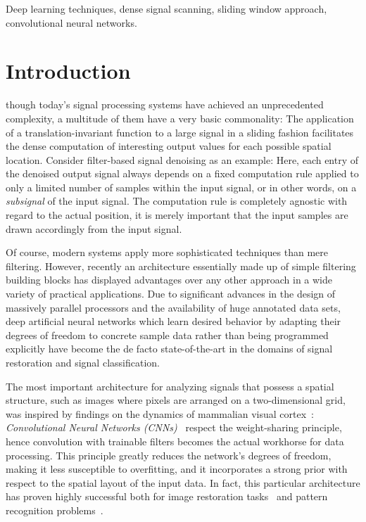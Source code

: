 \documentclass[journal]{IEEEtran}
\begin{document}
\begin{IEEEkeywords}
Deep learning techniques, dense signal scanning, sliding window approach, convolutional neural networks.
\end{IEEEkeywords}

\section{Introduction}
 though today's signal processing systems have achieved an unprecedented complexity, a multitude of them have a very basic commonality:
The application of a translation-invariant function to a large signal in a sliding fashion facilitates the dense computation of interesting output values for each possible spatial location.
Consider filter-based signal denoising as an example:
Here, each entry of the denoised output signal always depends on a fixed computation rule applied to only a limited number of samples within the input signal, or in other words, on a \emph{subsignal} of the input signal.
The computation rule is completely agnostic with regard to the actual position, it is merely important that the input samples are drawn accordingly from the input signal.

Of course, modern systems apply more sophisticated techniques than mere filtering.
However, recently an architecture essentially made up of simple filtering building blocks has displayed advantages over any other approach in a wide variety of practical applications.
Due to significant advances in the design of massively parallel processors and the availability of huge annotated data sets, deep artificial neural networks which learn desired behavior by adapting their degrees of freedom to concrete sample data rather than being programmed explicitly have become the de facto state-of-the-art in the domains of signal restoration and signal classification.

The most important architecture for analyzing signals that possess a spatial structure, such as images where pixels are arranged on a two-dimensional grid, was inspired by findings on the dynamics of mammalian visual cortex~\cite{Hubel1962}:
\emph{Convolutional Neural Networks (CNNs)}~\cite{Fukushima1980,LeCun1990a,LeCun1998} respect the weight-sharing principle, hence convolution with trainable filters becomes the actual workhorse for data processing.
This principle greatly reduces the network's degrees of freedom, making it less susceptible to overfitting, and it incorporates a strong prior with respect to the spatial layout of the input data.
In fact, this particular architecture has proven highly successful both for image restoration tasks~\cite{Jain2009,Xu2015,Dong2016} and pattern recognition problems~\cite{Ciresan2012a,Krizhevsky2013,Szegedy2015}.
\end{document}
